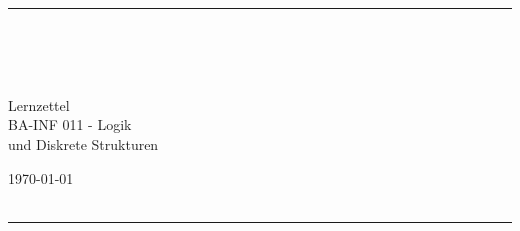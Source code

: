 


\fancyhead[C]{}
\hrule \medskip
\begin{minipage}{0.295\textwidth} 
\raggedright
\nameA \hfill \\
\nameB \hfill \\
\nameC \hfill \\
\end{minipage}
\begin{minipage}{0.4\textwidth} 
\centering 
\large 
{Lernzettel\\ 
\normalsize 
BA-INF 011 - Logik}\\ und Diskrete Strukturen\\         %
\end{minipage}
\begin{minipage}{0.295\textwidth} 
\raggedleft
\today\hfill\\
\yourgroup\hfill\\
\end{minipage}
\medskip\hrule
\bigskip

